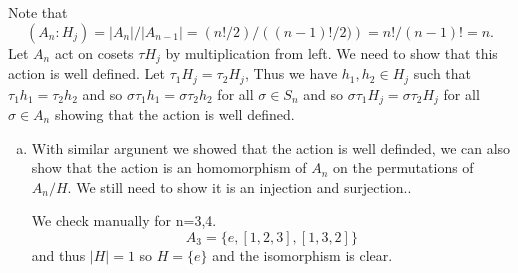 \documentclass[12pt]{book}
\newcounter{myenumi}
\newenvironment{myenumerate}
{\begin{enumerate}
 \setcounter{enumi}{\themyenumi}
}
{\setcounter{myenumi}{\theenumi}
 \end{enumerate}}
\begin{document}
\begin{myenumerate}
Note that
\begin{equation*}
(A_n: H_j) = |A_n|/|A_{n-1}| = (n!/2)/\left((n-1)!/2)\right) = n!/(n-1)! = n.
\end{equation*}
Let \(A_n\) act on cosets \(\tau H_j\) by multiplication from left.
We need to show that this action is well defined.
Let \(\tau_1 H_j = \tau_2 H_j\),
Thus we have \(h_1,h_2\in H_j\) such that
\(\tau_1 h_1 = \tau_2 h_2\)
and so
\(\sigma\tau_1 h_1 = \sigma\tau_2 h_2\) for all \(\sigma \in S_n\)
and so
\(\sigma\tau_1 H_j = \sigma\tau_2 H_j\) for all \(\sigma \in A_n\)
showing that the action is well defined.
\begin{enumerate}[(a)]
\item
With similar argunent we showed that the action is well definded,
we can also show that the action is an homomorphism of \(A_n\)
on the permutations of \(A_n/H\).
We still need to show it is an injection and surjection..

We check manually for n=3,4.
\begin{equation*}
A_3 = \{e, [1,2,3], [1, 3, 2]\}
\end{equation*}
and thus \(|H|=1\) so \(H=\{e\}\) and the isomorphism is clear.


\end{enumerate}
\end{myenumerate}
\end{document}
